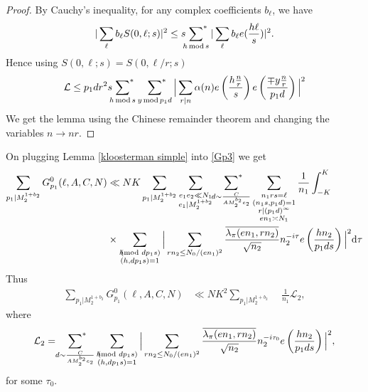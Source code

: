 \documentclass[12pt,a4paper,twoside, reqno]{amsart}
\newcommand{\shortmod}{\ensuremath{\negthickspace \negthickspace \negthickspace \pmod}}
\newcommand{\sumstar}{\sideset{}{^*}\sum}
\begin{document}
\begin{proof}
By Cauchy's inequality, for any complex coefficients $b_\ell$, we have 
\[|\sum_\ell b_\ell S(0, \ell;s)|^2\leq s \sumstar_{h \, \mathrm{mod}\, s} |\sum_\ell b_\ell e(\frac{h\ell}{s})|^2. \]
Hence using $S(0,\ell;s)=S(0,\ell/r;s)$ 
\[\mathcal{L} \leq p_1dr^2s  \sumstar_{h \, \mathrm{mod}\, s} \ \sumstar_{y\, \mathrm{mod}\, p_1d}\Big| \sum_{r|n} \alpha(n) e \left( \frac{ h\frac{n}{r}}{s} \right) e \left( \frac{\mp y\frac{n}{r}}{p_1d} \right)\Big|^2   \]
We get the lemma using the Chinese remainder theorem and changing the variables $n \rightarrow nr$.
\end{proof}

On plugging Lemma \ref{kloosterman simple} into \eqref{Gp3} we get 
\begin{align*}
     \sum_{p_1| M_2^{1+b_2}} G_{p_1}^0(\ell, A,C,N )  &\ll  NK  \sum_{p_1| M_2^{1+b_2}} \mathop{\sum_{\substack {e_1e_2 \ll N_1 \\ e_1 \mid M_2^{1+b_2} }   }}\mathop{\sumstar_{ \substack{d \sim \frac{C}{A M_2^{b_2} e_2}
       } } }    \mathop{\sum_{ \substack{n_1rs= \ell \\ (n_1s,p_1d)=1 \\ r | (p_1d)^\infty \\ en_1 \asymp N_1 }}} \frac{1}{n_1}    \int_{-K}^K  \\
       & \times \sum_{\substack{ h \shortmod{dp_1 s} \\ (h, dp_1s)=1 }   } \Big|   \sum_{rn_2 \leq  N_0/(en_1)^2}\frac{\overline{\lambda_\pi(en_1,rn_2)}}{ \sqrt{ n_2}  } n_2^{{-i \tau}} e\left( \frac{hn_2}{p_1ds}\right)     \Big|^2 \mathrm{d} \tau
\end{align*}
Thus 
\begin{align}\label{before large sieve AV}
      \sum_{p_1 | M_2^{1+b_2}}G_{p_1}^0(\ell, A,C,N)  &\ll  NK^2 \sum_{p_1 | M_2^{1+b_2}} \mathop{\sum_{\substack {e_1e_2 \ll N_1  \\ e_1|M_2^{1+b_2}  }   }}  \mathop{\sum_{ \substack{n_1rs= \ell \\ (n_1s,p_1d)=1 \\ r | (p_1d)^\infty \\ en_1 \asymp N_1 }}} \frac{1}{n_1} \mathcal{L}_2 ,
\end{align}
where 
\[ \mathcal{L}_2= \mathop{\sumstar_{ \substack{d \sim \frac{C}{A M_2^{b_2} e_2}
       } } } \sum_{\substack{ h \shortmod{dp_1 s} \\ (h, dp_1s)=1 }   } \Big|   \sum_{rn_2 \leq N_0/(en_1)^2} \frac{\overline{ \lambda_\pi(en_1,rn_2)}}{ \sqrt{ n_2}  } n_2^{{-i \tau_0}} e\left( \frac{hn_2}{p_1ds}\right)     \Big|^2,\]
for some $\tau_0$.
\end{document}
